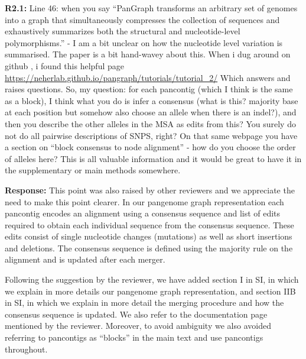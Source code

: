 \documentclass[aps,rmp,onecolumn]{revtex4-1}
\newcommand{\Marco}[1]{{\color{orange}Marco: #1}}
\newcommand{\Liam}[1]{{\color{teal}Liam: #1}}
\newcommand{\reviewer}[2]{\textbf{#1:} #2\vskip 5mm}
\newcommand{\response}[1]{{\it {\color{response}\textbf{Response:} #1}}\vskip 5mm}
\newcommand{\SIgraph}{I}
\newcommand{\SIalgo}{II}
\begin{document}
\reviewer{R2.1}{Line 46: when you say ``PanGraph transforms an arbitrary set of genomes into a graph that simultaneously compresses the collection of sequences and exhaustively summarizes both the structural and nucleotide-level polymorphisms.'' - I am a bit unclear on how the nucleotide level variation is summarised. The paper is a bit hand-wavey about this. When i dug around on github , i found this helpful page \url{https://neherlab.github.io/pangraph/tutorials/tutorial_2/} Which answers and raises questions. So, my question: for each pancontig (which I think is the same as a block), I think what you do is infer a consensus (what is this? majority base at each position but somehow also choose an allele when there is an indel?), and then you describe the other alleles in the MSA as edits from this? You surely do not do all pairwise descriptions of SNPS, right? On that same webpage you have a section on ``block consensus to node alignment'' - how do you choose the order of alleles here? This is all valuable information and it would be great to have it in the supplementary or main methods somewhere.}
\response{This point was also raised by other reviewers and we appreciate the need to make this point clearer.
In our pangenome graph representation each pancontig encodes an alignment using a consensus sequence and list of edits required to obtain each individual sequence from the consensus sequence.
These edits consist of single nucleotide changes (mutations) as well as short insertions and deletions.
The consensus sequence is defined using the majority rule on the alignment and is updated after each merger.

Following the suggestion by the reviewer, we have added section {\SIgraph} in SI, in which we explain in more details our pangenome graph representation, and section {\SIalgo}B in SI, in which we explain in more detail the merging procedure and how the consensus sequence is updated. 
We also refer to the documentation page mentioned by the reviewer. Moreover, to avoid ambiguity we also avoided referring to pancontigs as ``blocks'' in the main text and use pancontigs throughout.}
\end{document}
